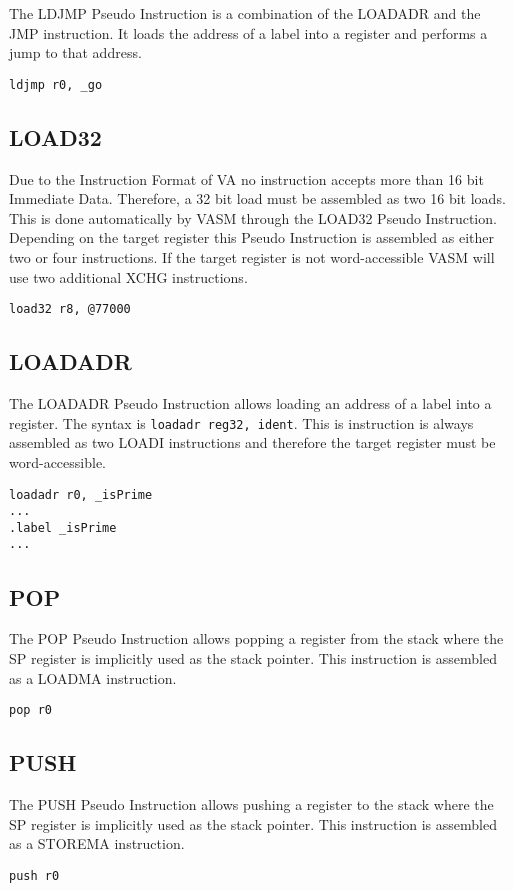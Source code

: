 The LDJMP Pseudo Instruction is a combination of the LOADADR and the JMP instruction. It loads the address of a label into a register and
performs a jump to that address. 

\begin{verbatim}
ldjmp r0, _go
\end{verbatim}

\subsection{LOAD32}

Due to the Instruction Format of VA no instruction accepts more than 16 bit Immediate Data. Therefore, a 32 bit load must be assembled as two 16 bit loads.
This is done automatically by VASM through the LOAD32 Pseudo Instruction. Depending on the target register this Pseudo Instruction is assembled as either
two or four instructions. If the target register is not word-accessible VASM will use two additional XCHG instructions. 

\begin{verbatim}
load32 r8, @77000
\end{verbatim}

\subsection{LOADADR}

The LOADADR Pseudo Instruction allows loading an address of a label into a register. The syntax is \verb|loadadr reg32, ident|. This is instruction is always
assembled as two LOADI instructions and therefore the target register must be word-accessible. 

\begin{verbatim}
loadadr r0, _isPrime
...
.label _isPrime
...
\end{verbatim}

\subsection{POP}

The POP Pseudo Instruction allows popping a register from the stack where the SP register is implicitly used as the stack pointer. This instruction is assembled
as a LOADMA instruction. 

\begin{verbatim}
pop r0
\end{verbatim}

\subsection{PUSH}

The PUSH Pseudo Instruction allows pushing a register to the stack where the SP register is implicitly used as the stack pointer. This instruction is assembled
as a STOREMA instruction.

\begin{verbatim}
push r0
\end{verbatim}
